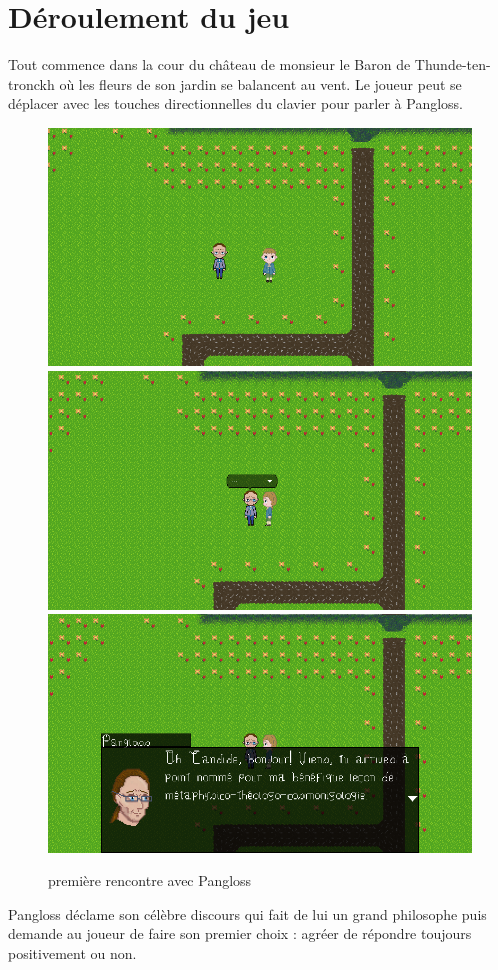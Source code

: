 \documentclass[11pt]{article}
\begin{document}
\section{Déroulement du jeu}
Tout commence dans la cour du château de monsieur le Baron de Thunde-ten-tronckh où les fleurs de son jardin se balancent au vent. Le joueur peut se déplacer avec les touches directionnelles du clavier pour parler à Pangloss.
\begin{figure}[H]
\includegraphics[scale=0.35]{gameplay1}
\includegraphics[scale=0.35]{gameplay2}
\includegraphics[scale=0.35]{gameplay3}
\centering
\caption{première rencontre avec Pangloss}
\end{figure}
Pangloss déclame son célèbre discours qui fait de lui un grand philosophe puis demande au joueur de faire son premier choix : agréer de répondre toujours positivement ou non. \\
\end{document}
